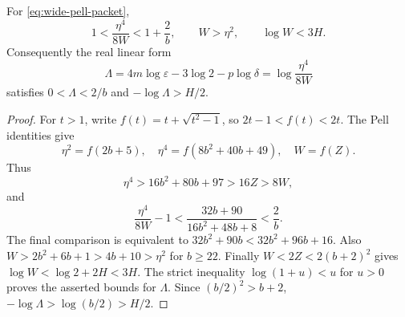 \begin{lemma}\label{lem:matveev-approximation}
For \eqref{eq:wide-pell-packet},
\[
 1<\frac{\eta^4}{8W}<1+\frac2b,\qquad
 W>\eta^2,\qquad \log W<3H.
\]
Consequently the real linear form
\begin{equation}\label{eq:matveev-form}
 \Lambda=4m\log\varepsilon-3\log2-p\log\delta
        =\log\frac{\eta^4}{8W}
\end{equation}
satisfies $0<\Lambda<2/b$ and $-\log\Lambda>H/2$.
\end{lemma}
\begin{proof}
For $t>1$, write $f(t)=t+\sqrt{t^2-1}$, so $2t-1<f(t)<2t$.
The Pell identities give
\[
 \eta^2=f(2b+5),\quad \eta^4=f(8b^2+40b+49),\quad W=f(Z).
\]
Thus
\[
 \eta^4>16b^2+80b+97>16Z>8W,
\]
and
\[
 \frac{\eta^4}{8W}-1
 <\frac{32b+90}{16b^2+48b+8}<\frac2b.
\]
The final comparison is equivalent to
$32b^2+90b<32b^2+96b+16$.
Also $W>2b^2+6b+1>4b+10>\eta^2$ for $b\ge22$.
Finally $W<2Z<2(b+2)^2$ gives $\log W<\log2+2H<3H$.
The strict inequality $\log(1+u)<u$ for $u>0$ proves the asserted
bounds for $\Lambda$. Since $(b/2)^2>b+2$,
$-\log\Lambda>\log(b/2)>H/2$.
\end{proof}

